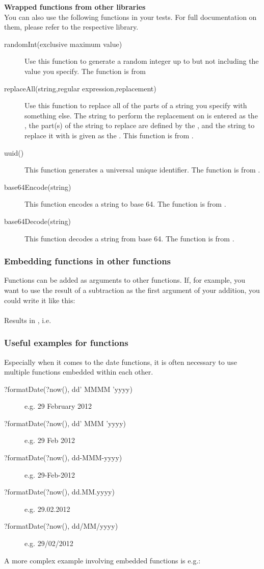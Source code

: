 \textbf{Wrapped functions from other libraries}\\
You can also use the following functions in your tests. For full documentation on them, please refer to the respective library.
\begin{description}
\item [randomInt(exclusive maximum value)]{Use this function to generate a random integer up to but not including the value you specify. The function is from }
\item [replaceAll(string,regular expression,replacement)]{Use this function to replace all of the parts of a string you specify with something else. The string to perform the replacement on is entered as the , the part(s) of the string to replace are defined by the , and the string to replace it with is given as the . This function is from .}
\item [uuid()]{This function generates a universal unique identifier. The function is from .}
\item [base64Encode(string)]{This function encodes a string to base 64. The function is from .}
\item [base64Decode(string)]{This function decodes a string from base 64. The function is from .}
\end{description}

\subsubsection{Embedding functions in other functions}
Functions can be added as arguments to other functions. If, for example, you want to use the result of a subtraction as the first argument of your addition, you could write it like this:\\
\\
Results in , i.e. \\

\subsubsection{Useful examples for functions}
Especially when it comes to the date functions, it is often necessary to use multiple functions embedded within each other. 
\begin{description}
\item [?formatDate(?now(), dd' MMMM 'yyyy)]{e.g. 29 February 2012}
\item [?formatDate(?now(), dd' MMM 'yyyy)]{e.g. 29 Feb 2012}
\item [?formatDate(?now(), dd-MMM-yyyy)]{e.g. 29-Feb-2012}
\item [?formatDate(?now(), dd.MM.yyyy)]{e.g. 29.02.2012}
\item [?formatDate(?now(), dd/MM/yyyy)]{e.g. 29/02/2012}
\end{description}
A more complex example involving embedded functions is e.g.:

